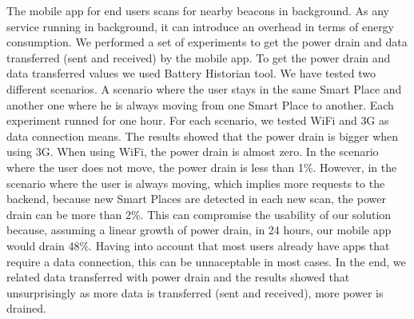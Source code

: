 The mobile app for end users scans for nearby beacons in background.
As any service running in background, it can introduce an overhead in terms of energy consumption.
We performed a set of experiments to get the power drain and data transferred (sent and received) by the mobile app.
To get the power drain and data transferred values we used Battery Historian tool.
We have tested two different scenarios. A scenario where the user stays in the same Smart Place and another one where he is always moving from one Smart Place to another.
Each experiment runned for one hour.
For each scenario, we tested \gls{WiFi} and \gls{3G} as data connection means.
The results showed that the power drain is bigger when using \gls{3G}. When using \gls{WiFi}, the power drain is almost zero.
In the scenario where the user does not move, the power drain is less than 1\%.
However, in the scenario where the user is always moving, which implies more requests to the backend, because new Smart Places are detected in each new scan, the power drain can be more than 2\%.
This can compromise the usability of our solution because, assuming a linear growth of power drain, in 24 hours, our mobile app would drain 48\%.
Having into account that most users already have apps that require a data connection, this can be unnaceptable in most cases.
In the end, we related data transferred with power drain and the results showed that unsurprisingly as more data is transferred (sent and received), more power is drained.
